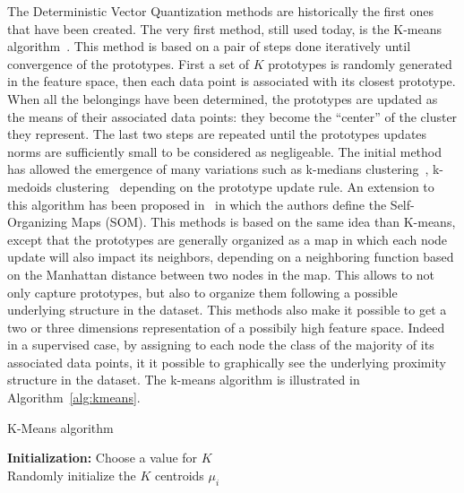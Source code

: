     The Deterministic Vector Quantization methods are historically the first ones that have been created. The very first method, still used today, is the K-means algorithm~\cite{macqueen1967some}. This method is based on a pair of steps done iteratively until convergence of the prototypes. First a set of $K$ prototypes is randomly generated in the feature space, then each data point is associated with its closest prototype. When all the belongings have been determined, the prototypes are updated as the means of their associated data points: they become the ``center'' of the cluster they represent. The last two steps are repeated until the prototypes updates norms are sufficiently small to be considered as negligeable. The initial method has allowed the emergence of many variations such as k-medians clustering~\cite{jain1988algorithms}, k-medoids clustering~\cite{kaufman1987clustering} depending on the prototype update rule. An extension to this algorithm has been proposed in~\cite{kohonen1998self} in which the authors define the Self-Organizing Maps (SOM). This methods is based on the same idea than K-means, except that the prototypes are generally organized as a map in which each node update will also impact its neighbors, depending on a neighboring function based on the Manhattan distance between two nodes in the map. This allows to not only capture prototypes, but also to organize them following a possible underlying structure in the dataset. This methods also make it possible to get a two or three dimensions representation of a possibily high feature space. Indeed in a supervised case, by assigning to each node the class of the majority of its associated data points, it it possible to graphically see the underlying proximity structure in the dataset. The k-means algorithm is illustrated in Algorithm~\ref{alg:kmeans}.

    \begin{algorithm}
        \caption{K-Means algorithm}
\label{alg:kmeans}
        \textbf{Initialization:} Choose a value for $K$\\
        Randomly initialize the $K$ centroids $\mu_i$\\
    \end{algorithm}

